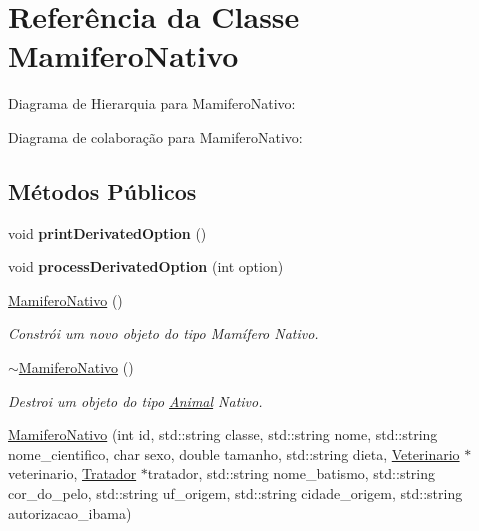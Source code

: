 \hypertarget{classMamiferoNativo}{}\section{Referência da Classe Mamifero\+Nativo}
\label{classMamiferoNativo}


Diagrama de Hierarquia para Mamifero\+Nativo\+:


Diagrama de colaboração para Mamifero\+Nativo\+:
\subsection*{Métodos Públicos}
\begin{DoxyCompactItemize}
\item 
\mbox{\label{classMamiferoNativo_a8bd1279f827dc2609a145e9f54b2a8c3}} 
void {\bfseries print\+Derivated\+Option} ()
\item 
\mbox{\label{classMamiferoNativo_aa1a97fe8e86c8240661eadb5ae402ba5}} 
void {\bfseries process\+Derivated\+Option} (int option)
\item 
\mbox{\label{classMamiferoNativo_a6588fa54551bfa9df23749d2b2b00b05}} 
\hyperlink{classMamiferoNativo_a6588fa54551bfa9df23749d2b2b00b05}{Mamifero\+Nativo} ()
\begin{DoxyCompactList}\small\item\em Constrói um novo objeto do tipo Mamífero Nativo. \end{DoxyCompactList}\item 
\mbox{\label{classMamiferoNativo_aa08f523498d6713873a29747024e5717}} 
\hyperlink{classMamiferoNativo_aa08f523498d6713873a29747024e5717}{$\sim$\+Mamifero\+Nativo} ()
\begin{DoxyCompactList}\small\item\em Destroi um objeto do tipo \hyperlink{classAnimal}{Animal} Nativo. \end{DoxyCompactList}\item 
\hyperlink{classMamiferoNativo_a7c56682680010d93b58925b766afc798}{Mamifero\+Nativo} (int id, std\+::string classe, std\+::string nome, std\+::string nome\+\_\+cientifico, char sexo, double tamanho, std\+::string dieta, \hyperlink{classVeterinario}{Veterinario} $\ast$veterinario, \hyperlink{classTratador}{Tratador} $\ast$tratador, std\+::string nome\+\_\+batismo, std\+::string cor\+\_\+do\+\_\+pelo, std\+::string uf\+\_\+origem, std\+::string cidade\+\_\+origem, std\+::string autorizacao\+\_\+ibama)

\end{DoxyCompactItemize}
